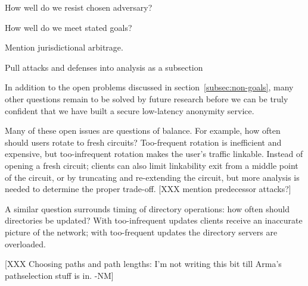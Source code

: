 \documentclass[times,10pt,twocolumn]{article}
\begin{document}
How well do we resist chosen adversary?

How well do we meet stated goals?

Mention jurisdictional arbitrage.

Pull attacks and defenses into analysis as a subsection

\label{sec:maintaining-anonymity}
 



In addition to the open problems discussed in
section~\ref{subsec:non-goals}, many other questions remain to be
solved by future research before we can be truly confident that we
have built a secure low-latency anonymity service.

Many of these open issues are questions of balance.  For example,
how often should users rotate to fresh circuits?  Too-frequent
rotation is inefficient and expensive, but too-infrequent rotation
makes the user's traffic linkable.   Instead of opening a fresh
circuit; clients can also limit linkability exit from a middle point
of the circuit, or by truncating and re-extending the circuit, but
more analysis is needed to determine the proper trade-off.
[XXX mention predecessor attacks?]

A similar question surrounds timing of directory operations:
how often should directories be updated?  With too-infrequent
updates clients receive an inaccurate picture of the network; with
too-frequent updates the directory servers are overloaded.

%

[XXX Choosing paths and path lengths: I'm not writing this bit till
  Arma's pathselection stuff is in. -NM]
\end{document}
